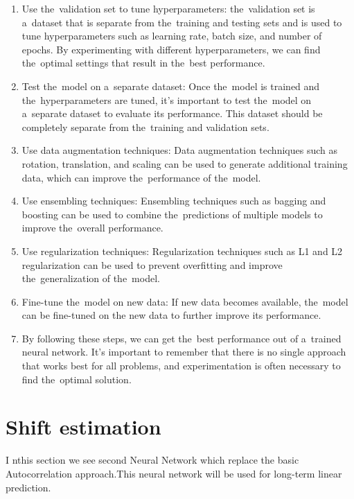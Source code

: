         \begin{enumerate}
            \item Use the~validation set to tune hyperparameters: the~validation set is a~dataset that is separate
            from the~training and testing sets and is used to tune hyperparameters such as learning rate, batch size,
            and number of epochs. By experimenting with different hyperparameters, we can find the~optimal settings
            that result in the~best performance.
            \item Test the~model on a~separate dataset: Once the~model is trained and the~hyperparameters are tuned,
            it's important to test the~model on a~separate dataset to evaluate its performance. This dataset should be
            completely separate from the~training and validation sets.
            \item Use data augmentation techniques: Data augmentation techniques such as rotation, translation, and
            scaling can be used to generate additional training data, which can improve the~performance of the~model.
            \item Use ensembling techniques: Ensembling techniques such as bagging and boosting can be used to
            combine the~predictions of multiple models to improve the~overall performance.
            \item Use regularization techniques: Regularization techniques such as L1 and L2 regularization
            can be used to prevent overfitting and improve the~generalization of the~model.
            \item Fine-tune the~model on new data: If new data becomes available, the~model can be fine-tuned on the
            new data to further improve its performance.
            \item By following these steps, we can get the~best performance out of a~trained neural network.
            It's important to remember that there is no single approach that works best for all problems, and
            experimentation is often necessary to find the~optimal solution.
        \end{enumerate}
    \section{Shift estimation}\label{sec:shiftcalc}
    I nthis section we see second Neural Network which replace the basic Autocorrelation approach.This neural network will be used for long-term linear prediction.
